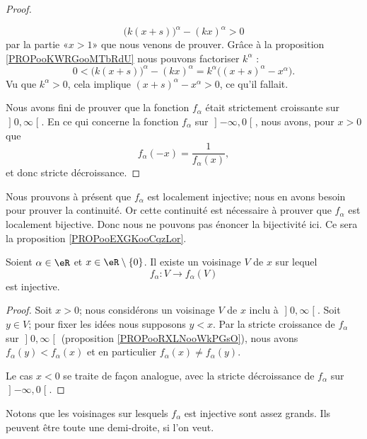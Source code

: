 \begin{proof}
\begin{subproof}
            \begin{equation}
                \big( k(x+s) \big)^{\alpha}-(kx)^{\alpha}>0
            \end{equation}
            par la partie «\( x>1\)» que nous venons de prouver. Grâce à la proposition \ref{PROPooKWRGooMTbRdU} nous pouvons factoriser \( k^{\alpha}\) :
            \begin{equation}
                0<\big( k(x+s) \big)^{\alpha}-(kx)^{\alpha}=k^{\alpha}\big( (x+s)^{\alpha}-x^{\alpha} \big).
            \end{equation}
            Vu que \( k^{\alpha}>0\), cela implique \( (x+s)^{\alpha}-x^{\alpha}>0\), ce qu'il fallait.
    \end{subproof}
Nous avons fini de prouver que la fonction \( f_{\alpha}\) était strictement croissante sur \( \mathopen] 0 , \infty \mathclose[\). En ce qui concerne la fonction \( f_{\alpha}\) sur \( \mathopen] -\infty , 0 \mathclose[\), nous avons, pour \( x>0\) que
    \begin{equation}
        f_{\alpha}(-x)=\frac{1}{ f_{\alpha}(x) },
    \end{equation}
    et donc stricte décroissance.
\end{proof}

Nous prouvons à présent que \( f_{\alpha}\) est localement injective; nous en avons besoin pour prouver la continuité. Or cette continuité est nécessaire à prouver que \( f_{\alpha}\) est localement bijective. Donc nous ne pouvons pas énoncer la bijectivité ici. Ce sera la proposition \ref{PROPooEXGKooCqzLor}.

\begin{proposition}     \label{PROPooHKTKooCUEBjh}
    Soient \( \alpha\in \eR\) et \( x\in \eR\setminus\{ 0 \}\). Il existe un voisinage \( V\) de \( x\) sur lequel
    \begin{equation}
            f_{\alpha}\colon V \to f_{\alpha}(V) 
    \end{equation}
    est injective.
\end{proposition}

\begin{proof}
Soit \( x>0 \); nous considérons un voisinage \( V\) de \( x\) inclu à \( \mathopen] 0 , \infty \mathclose[\). Soit \( y\in V\); pour fixer les idées nous supposons \( y<x\). Par la stricte croissance de \( f_{\alpha}\) sur \( \mathopen] 0 , \infty \mathclose[\) (proposition \ref{PROPooRXLNooWkPGsO}), nous avons \( f_{\alpha}(y)<f_{\alpha}(x)\) et en particulier \( f_{\alpha}(x)\neq f_{\alpha}(y)\).

Le cas \( x<0\) se traite de façon analogue, avec la stricte décroissance de \( f_{\alpha}\) sur \( \mathopen] -\infty , 0 \mathclose[\).
\end{proof}
Notons que les voisinages sur lesquels \( f_{\alpha}\) est injective sont assez grands. Ils peuvent être toute une demi-droite, si l'on veut.

